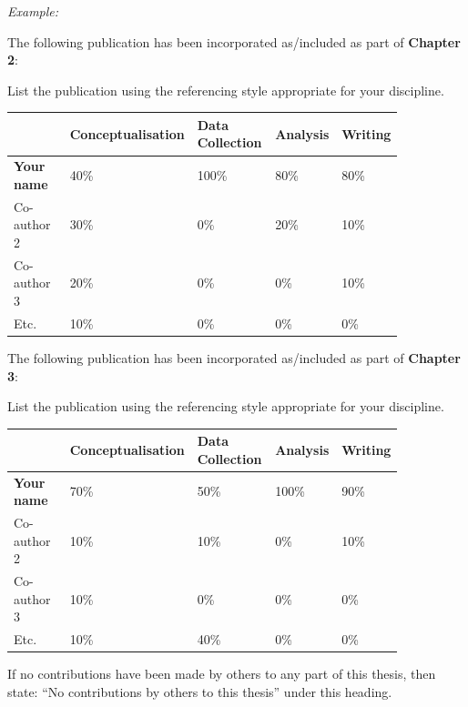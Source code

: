 \begin{instructional}
\clearpage

    \noindent
    \textit{Example:} 
    
    \noindent
    The following publication has been {incorporated as/included as part of} \textbf{Chapter 2}: 
    
    \noindent
    List the publication using the referencing style appropriate for your discipline.

    \begin{table}[h]
	\begin{center}
    {\color{UQPurple}
    \begin{tabular}{|p{0.15\linewidth} | p{0.20\linewidth} | p{0.20\linewidth} | p{0.15\linewidth} | p{0.15\linewidth}|}
        \hline
        & \textbf{Conceptualisation} & \textbf{Data Collection} & \textbf{Analysis} & \textbf{Writing} \\
        \hline
        \textbf{Your name }   & 40\% & 100\% & 80\% & 80\% \\
        \hline
        Co-author 2  & 30\% & 0\% & 20\%   & 10\% \\
        \hline
        Co-author 3  & 20\% & 0\%  & 0\%   & 10\%  \\
        \hline
        Etc.         & 10\% & 0\% & 0\%   & 0\%  \\
        \hline
    \end{tabular}
    }
    \end{center}
    \end{table}
    
    \noindent
    The following publication has been {incorporated as/included as part of} \textbf{Chapter 3}: 

    \noindent
    List the publication using the referencing style appropriate for your discipline.

\begin{table}[h]
\begin{center}
{\color{UQPurple}
    \begin{tabular}{|p{0.15\linewidth} | p{0.20\linewidth} | p{0.20\linewidth} | p{0.15\linewidth} | p{0.15\linewidth}|}
    \hline
    & \textbf{Conceptualisation} & \textbf{Data Collection} & \textbf{Analysis} & \textbf{Writing} \\
    \hline
    \textbf{Your name}   & 70\% & 50\% & 100\% & 90\% \\
    \hline
    Co-author 2  & 10\% & 10\% & 0\%   & 10\% \\
    \hline
    Co-author 3  & 10\% & 0\%  & 0\%   & 0\%  \\
    \hline
    Etc.         & 10\% & 40\% & 0\%   & 0\%  \\
    \hline
\end{tabular}
}
\end{center}
\end{table}


    \noindent
	If no contributions have been made by others to any part of this thesis, then state: ``No contributions by others to this thesis'' under this heading. 


\end{instructional}

